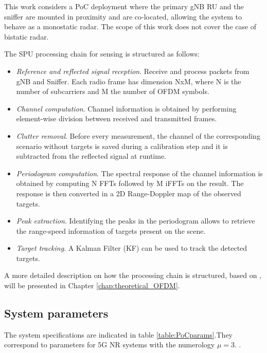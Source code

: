 	This work considers a PoC deployment where the primary gNB RU and the sniffer are mounted in proximity and are co-located, allowing the system to behave as a monostatic radar. 
	The scope of this work does not cover the case of bistatic radar.
	
	The SPU processing chain for sensing is structured as follows:
	
	\begin{itemize}
		\item \textit{Reference and reflected signal reception}. Receive and process packets from gNB and Sniffer. Each radio frame has dimension NxM, where N is the number of subcarriers and M the number of OFDM symbols.
		\item \textit{Channel computation}. Channel information is obtained by performing element-wise division between received and transmitted frames.
		\item \textit{Clutter removal}. Before every measurement, the channel of the corresponding scenario without targets is saved during a calibration step and it is subtracted from the reflected signal at runtime.
		\item \textit{Periodogram computation}. The spectral response of the channel information is obtained by computing N FFTs followed by M iFFTs on the result. The response is then converted in a 2D Range-Doppler map of the observed targets. 
		\item \textit{Peak extraction}. Identifying the peaks in the periodogram allows to retrieve the range-speed information of targets present on the scene.
		\item \textit{Target tracking}. A Kalman Filter (KF) can be used to track the detected targets. 
	\end{itemize} 
	A more detailed description on how the processing chain is structured,  based on \cite{Braun2014OFDMRA}, will be presented in Chapter \ref{chap:theoretical_OFDM}.
	
	
	\subsection{System parameters}
	
	The system specifications are indicated in table \ref{table:PoCparams}.They correspond to parameters for 5G NR systems with the numerology $\mu=3$. \cite{TS138211}. 
	
